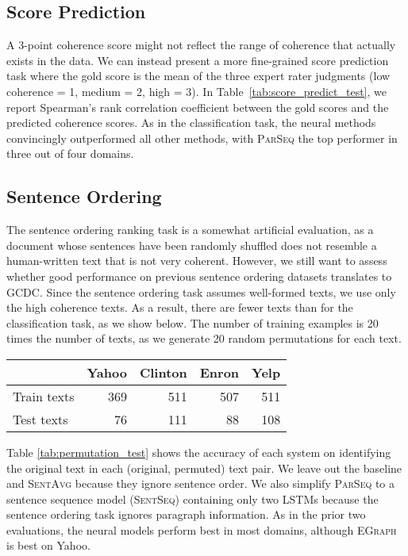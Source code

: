 \documentclass[11pt,a4paper]{article}
\newcommand \egraph{\textsc{EGraph}\xspace}
\newcommand \parseq{\textsc{ParSeq}\xspace}
\newcommand \sentseq{\textsc{SentSeq}\xspace}
\newcommand \sentavg{\textsc{SentAvg}\xspace}
\newcommand \dataset{\textsc{GCDC}\xspace}
\begin{document}
\subsection{Score Prediction}



A 3-point coherence score might not reflect the range of coherence that actually exists in the data. We can instead present a more fine-grained score prediction task where the gold score is the mean of the three expert rater judgments (low coherence = 1, medium = 2, high = 3). In Table~\ref{tab:score_predict_test}, we report Spearman's rank correlation coefficient between the gold scores and the predicted coherence scores.  As in the classification task, the neural methods convincingly outperformed all other methods, with \parseq the top performer in three out of four domains.



\subsection{Sentence Ordering}
The sentence ordering ranking task is a somewhat artificial evaluation, as a document whose sentences have been randomly shuffled does not resemble a human-written text that is not very coherent. However, we still want to assess whether good performance on previous sentence ordering datasets translates to \dataset. Since the sentence ordering task assumes well-formed texts, we use only the high coherence texts. As a result, there are fewer texts than for the classification task, as we show below. The number of training examples is 20 times the number of texts, as we generate 20 random permutations for each text.


\begin{center}
\begin{small}
\begin{tabular}{lrrrr}
\toprule
 & Yahoo & Clinton & Enron & Yelp \\
\midrule
Train texts & 369 & 511 & 507 & 511\\
Test texts & 76 & 111 & 88 & 108 \\
\bottomrule
\end{tabular}
\end{small}
\end{center}










Table \ref{tab:permutation_test} shows the accuracy of each system on identifying the original text in each (original, permuted) text pair. We leave out the baseline and \sentavg because they ignore sentence order.  We also simplify \parseq to a sentence sequence model (\sentseq) containing only two LSTMs because the sentence ordering task ignores paragraph information.  As in the prior two evaluations, the neural models perform best in most domains, although \egraph is best on Yahoo.
\end{document}
